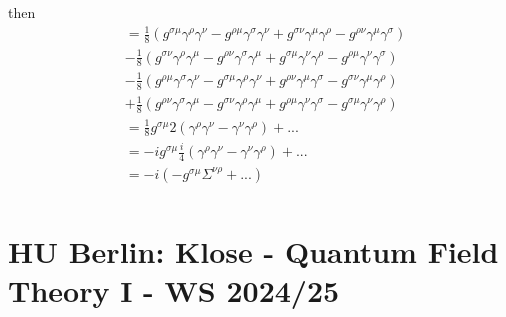 \documentclass[../main.tex]{subfiles}
\begin{document}
then
\begin{align}
[\Sigma^{\mu\nu},\Sigma^{\rho\sigma}]
&=\frac{1}{8}(
g^{\sigma\mu}\gamma^\rho\gamma^\nu
-g^{\rho\mu}\gamma^\sigma\gamma^\nu
+g^{\sigma\nu}\gamma^\mu\gamma^\rho
-g^{\rho\nu}\gamma^\mu\gamma^\sigma)\\
&-\frac{1}{8}(
g^{\sigma\nu}\gamma^\rho\gamma^\mu
-g^{\rho\nu}\gamma^\sigma\gamma^\mu
+g^{\sigma\mu}\gamma^\nu\gamma^\rho
-g^{\rho\mu}\gamma^\nu\gamma^\sigma)\\
&-\frac{1}{8}(
g^{\rho\mu}\gamma^\sigma\gamma^\nu
-g^{\sigma\mu}\gamma^\rho\gamma^\nu
+g^{\rho\nu}\gamma^\mu\gamma^\sigma
-g^{\sigma\nu}\gamma^\mu\gamma^\rho)\\
&+\frac{1}{8}(
g^{\rho\nu}\gamma^\sigma\gamma^\mu
-g^{\sigma\nu}\gamma^\rho\gamma^\mu
+g^{\rho\mu}\gamma^\nu\gamma^\sigma
-g^{\sigma\mu}\gamma^\nu\gamma^\rho)\\
&=\frac{1}{8}g^{\sigma\mu}2(\gamma^\rho\gamma^\nu-\gamma^\nu\gamma^\rho)+...\\
&=-ig^{\sigma\mu}\frac{i}{4}(\gamma^\rho\gamma^\nu-\gamma^\nu\gamma^\rho)+...\\
&=-i(-g^{\sigma\mu}\Sigma^{\nu\rho}+...)\\
\end{align}


\section{HU Berlin: {\sc Klose} - Quantum Field Theory I - WS 2024/25}
\end{document}

